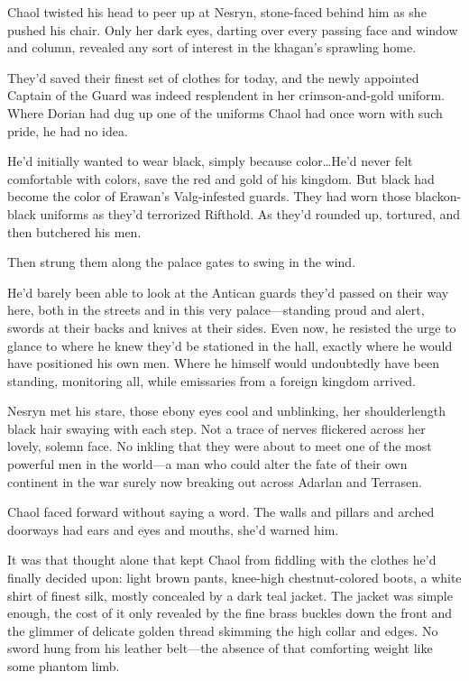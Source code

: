 Chaol twisted his head to peer up at Nesryn, stone-faced behind him as she pushed his chair.
Only her dark eyes, darting over every passing face and window and column, revealed any sort of interest in the khagan's sprawling home.

They'd saved their finest set of clothes for today, and the newly appointed Captain of the Guard was indeed resplendent in her crimson-and-gold uniform.
Where Dorian had dug up one of the uniforms Chaol had once worn with such pride, he had no idea.

He'd initially wanted to wear black, simply because color\ldots He'd never felt comfortable with colors, save the red and gold of his kingdom.
But black had become the color of Erawan's Valg-infested guards.
They had worn those blackon-black uniforms as they'd terrorized Rifthold.
As they'd rounded up, tortured, and then butchered his men.

Then strung them along the palace gates to swing in the wind.

He'd barely been able to look at the Antican guards they'd passed on their way here, both in the streets and in this very palace---standing proud and alert, swords at their backs and knives at their sides.
Even now, he resisted the urge to glance to where he knew they'd be stationed in the hall, exactly where he would have positioned his own men.
Where he himself would undoubtedly have been standing, monitoring all, while emissaries from a foreign kingdom arrived.

Nesryn met his stare, those ebony eyes cool and unblinking, her shoulderlength black hair swaying with each step.
Not a trace of nerves flickered across her lovely, solemn face.
No inkling that they were about to meet one of the most powerful men in the world---a man who could alter the fate of their own continent in the war surely now breaking out across Adarlan and Terrasen.

Chaol faced forward without saying a word.
The walls and pillars and arched doorways had ears and eyes and mouths, she'd warned him.

It was that thought alone that kept Chaol from fiddling with the clothes he'd finally decided upon: light brown pants, knee-high chestnut-colored boots, a white shirt of finest silk, mostly concealed by a dark teal jacket.
The jacket was simple enough, the cost of it only revealed by the fine brass buckles down the front and the glimmer of delicate golden thread skimming the high collar and edges.
No sword hung from his leather belt---the absence of that comforting weight like some phantom limb.

